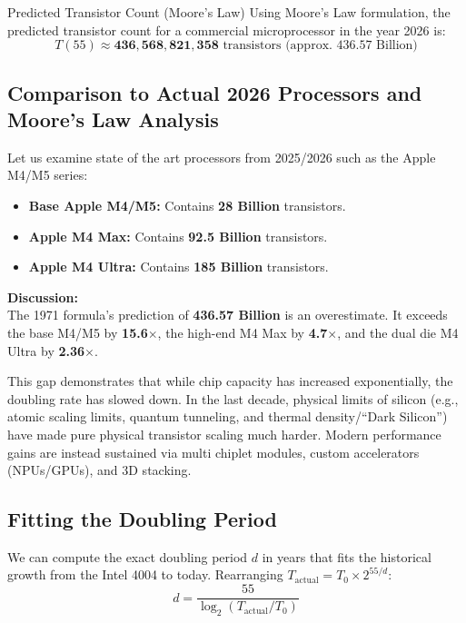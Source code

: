 \documentclass[11pt,a4paper]{article}
\begin{document}
\begin{resultbox}{Predicted Transistor Count (Moore's Law)}
Using Moore's Law formulation, the predicted transistor count for a commercial microprocessor in the year 2026 is:
\[ T(55) \approx \mathbf{436,568,821,358} \text{ transistors (approx. 436.57 Billion)} \]
\end{resultbox}

\subsection{Comparison to Actual 2026 Processors and Moore's Law Analysis}
Let us examine state of the art processors from 2025/2026 such as the Apple M4/M5 series:
\begin{itemize}
    \item \textbf{Base Apple M4/M5:} Contains \textbf{28 Billion} transistors.
    \item \textbf{Apple M4 Max:} Contains \textbf{92.5 Billion} transistors.
    \item \textbf{Apple M4 Ultra:} Contains \textbf{185 Billion} transistors.
\end{itemize}

\textbf{Discussion:} \\
The 1971 formula's prediction of \textbf{436.57 Billion} is an overestimate. It exceeds the base M4/M5 by \textbf{15.6$\times$}, the high-end M4 Max by \textbf{4.7$\times$}, and the dual die M4 Ultra by \textbf{2.36$\times$}. 

This gap demonstrates that while chip capacity has increased exponentially, the doubling rate has slowed down. In the last decade, physical limits of silicon (e.g., atomic scaling limits, quantum tunneling, and thermal density/“Dark Silicon”) have made pure physical transistor scaling much harder. Modern performance gains are instead sustained via multi chiplet modules, custom accelerators (NPUs/GPUs), and 3D stacking.

\subsection{Fitting the Doubling Period}
We can compute the exact doubling period $d$ in years that fits the historical growth from the Intel 4004 to today. Rearranging $T_{\text{actual}} = T_0 \times 2^{55 / d}$:
\[ d = \frac{55}{\log_2(T_{\text{actual}} / T_0)} \]
\end{document}
